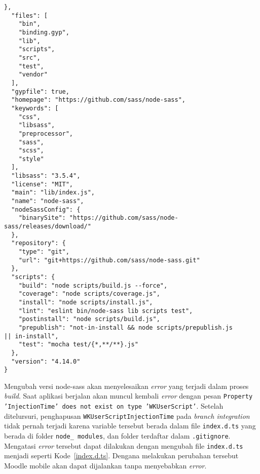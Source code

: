\begin{lstlisting}[frame=single, label ={node:sass version}, caption = Perubahan versi node-sass pada \texttt{package-lock.json} ]
  },
  "files": [
    "bin",
    "binding.gyp",
    "lib",
    "scripts",
    "src",
    "test",
    "vendor"
  ],
  "gypfile": true,
  "homepage": "https://github.com/sass/node-sass",
  "keywords": [
    "css",
    "libsass",
    "preprocessor",
    "sass",
    "scss",
    "style"
  ],
  "libsass": "3.5.4",
  "license": "MIT",
  "main": "lib/index.js",
  "name": "node-sass",
  "nodeSassConfig": {
    "binarySite": "https://github.com/sass/node-sass/releases/download/"
  },
  "repository": {
    "type": "git",
    "url": "git+https://github.com/sass/node-sass.git"
  },
  "scripts": {
    "build": "node scripts/build.js --force",
    "coverage": "node scripts/coverage.js",
    "install": "node scripts/install.js",
    "lint": "eslint bin/node-sass lib scripts test",
    "postinstall": "node scripts/build.js",
    "prepublish": "not-in-install && node scripts/prepublish.js 
|| in-install",
    "test": "mocha test/{*,**/**}.js"
  },
  "version": "4.14.0"
}

\end{lstlisting}

Mengubah versi node-sass akan menyelesaikan \textit{error} yang terjadi dalam proses \textit{build}. Saat aplikasi berjalan akan muncul kembali \textit{error} dengan pesan \texttt{Property 'InjectionTime' does not exist on type 'WKUserScript'}. Setelah ditelursuri, penghapusan \texttt{WKUserScriptInjectionTime} pada \textit{branch integration} tidak pernah terjadi karena variable tersebut berada dalam file \texttt{index.d.ts} yang berada di folder \texttt{node\_ modules}, dan folder terdaftar dalam \texttt{.gitignore}. Mengatasi \textit{error} tersebut dapat dilakukan dengan mengubah file \texttt{index.d.ts} menjadi seperti \mbox{Kode \ref{index.d.ts}}. Dengana melakukan perubahan tersebut Moodle mobile akan dapat dijalankan tanpa menyebabkan \textit{error}.

